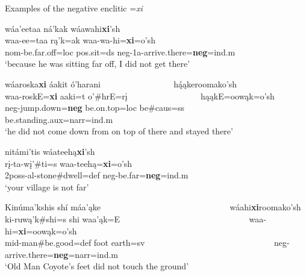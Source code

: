 \begin{exe}

\item\label{negativexi} Examples of the negative enclitic =\textit{xi}

	\begin{xlist}
	
	\item\label{negativexi1}
	\glll wáa'eetaa ná'kak wáawahi\textbf{xi}'sh\\
	waa-ee=taa rą'k=ak waa-wa-hi=\textbf{xi}=o'sh\\
	nom-\textnormal{be.far.off}=loc pos.sit=ds neg-1a-\textnormal{arrive.there}=\textbf{neg}=ind.m\\
	\glt `because he was sitting far off, I did not get there' \citep[10]{hollow1973b}

	\item\label{negativexi2}
	\glll wáaroska\textbf{xi} áakit ó'harani ~ ~ ~ ~ ~ ~ ~ ~ ~ ~ hą́ąkeroomako'sh\\
	waa-roskE=\textbf{xi} aaki=t o'\#hrE=rį ~ ~ ~ ~ ~ ~ ~ ~ ~ ~  hąąkE=oowąk=o'sh\\
	neg-\textnormal{jump.down}=\textbf{neg} \textnormal{be.on.top}=loc \textnormal{be}\#caus=ss ~ ~ ~ ~ ~ ~ ~ ~ ~ ~ \textnormal{be.standing}.aux=narr=ind.m\\
	\glt `he did not come down from on top of there and stayed there' \citep[143]{hollow1973b}

	\item\label{negativexi3}
	\glll nitámi'tis wáateehą\textbf{xi}'sh\\
	rį-ta-wį'\#ti=s waa-teehą=\textbf{xi}=o'sh\\
	2poss-al-\textnormal{stone}\#\textnormal{dwell}=def neg-\textnormal{be.far}=\textbf{neg}=ind.m\\
	\glt `your village is not far' \citep[29]{hollow1973b}

	\item\label{negativexi4}
	\glll Kinúma'kshis shí máa'ąke ~ ~ ~ ~ ~ ~ ~ ~ ~ ~ ~ ~ ~ ~ ~ ~ ~ ~   wáahi\textbf{xi}roomako'sh\\
	ki-ruwą'k\#shi=s shi waa'ąk=E ~ ~ ~ ~ ~ ~ ~ ~ ~ ~ ~ ~ ~ ~ ~ ~ ~ ~  waa-hi=\textbf{xi}=oowąk=o'sh\\
	mid-\textnormal{man}\#\textnormal{be.good}=def \textnormal{foot} \textnormal{earth}=sv ~ ~ ~ ~ ~ ~ ~ ~ ~ ~ ~ ~ ~ ~ ~ ~ ~ ~  neg-\textnormal{arrive.there}=\textbf{neg}=narr=ind.m\\
	\glt `Old Man Coyote's feet did not touch the ground' \citep[49]{hollow1973b}


\end{xlist}
\end{exe}
